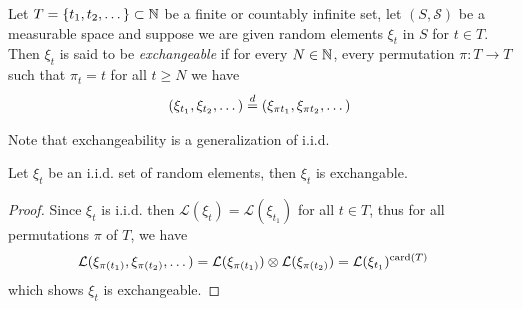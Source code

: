 \begin{defn}Let $T = \lbrace t_1, t_2, \dotsc \rbrace \subset \mathbb{N}$ be a finite or countably infinite set, let $(S, \mathcal{S})$ be a measurable space and suppose we are given random elements $\xi_t$ in $S$ for $t \in T$.  Then $\xi_t$ is said to be \emph{exchangeable} if for every $N \in \mathbb{N}$, every permutation $\pi : T \to T$ such that $\pi_t = t$ for all $t \geq N$ we have
\begin{align*}
(\xi_{t_1}, \xi_{t_2}, \dotsc) \overset{d}= (\xi_{\pi t_1}, \xi_{\pi t_2}, \dotsc) 
\end{align*}
\end{defn}

Note that exchangeability is a generalization of i.i.d.
\begin{prop}Let $\xi_t$ be an i.i.d. set of random elements, then $\xi_t$ is exchangable.
\end{prop}
\begin{proof}
Since $\xi_t$ is i.i.d. then $\mathcal{L}(\xi_t)=\mathcal{L}(\xi_{t_1})$ for all $t \in T$, thus for all permutations $\pi$ of $T$, we have
\begin{align*}
\mathcal{L}(\xi_{\pi (t_1)}, \xi_{\pi( t_2)}, \dotsc) &= 
\mathcal{L}(\xi_{\pi (t_1)}) \otimes \mathcal{L}(\xi_{\pi( t_2)}) = 
\mathcal{L}(\xi_{t_1})^{\operatorname*{card}(T)}
\end{align*}
which shows $\xi_t$ is exchangeable.
\end{proof}

